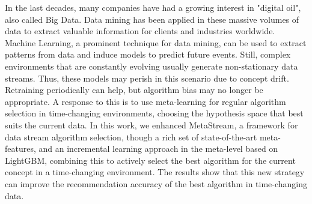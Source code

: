 In the last decades, many companies have had a growing interest in "digital oil", also called Big Data. Data mining has been applied in these massive volumes of data to extract valuable information for clients and industries worldwide. Machine Learning, a prominent technique for data mining, can be used to extract patterns from data and induce models to predict future events. Still, complex environments that are constantly evolving usually generate non-stationary data streams. Thus, these models may perish in this scenario due to concept drift. Retraining periodically can help, but algorithm bias may no longer be appropriate. A response to this is to use meta-learning for regular algorithm selection in time-changing environments, choosing the hypothesis space that best suits the current data. In this work, we enhanced MetaStream, a framework for data stream algorithm selection, though a rich set of state-of-the-art meta-features, and an incremental learning approach in the meta-level based on LightGBM, combining this to actively select the best algorithm for the current concept in a time-changing environment. The results show that this new strategy can improve the recommendation accuracy of the best algorithm in time-changing data.